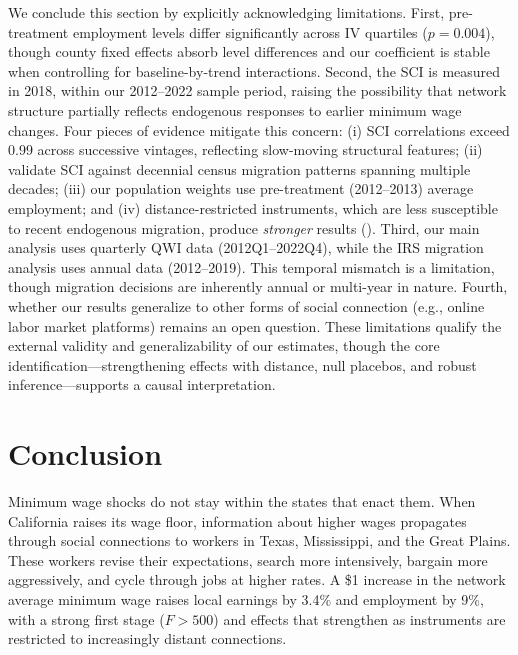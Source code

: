 \documentclass[12pt]{article}
\begin{document}
We conclude this section by explicitly acknowledging limitations. First, pre-treatment employment levels differ significantly across IV quartiles ($p = 0.004$), though county fixed effects absorb level differences and our coefficient is stable when controlling for baseline-by-trend interactions. Second, the SCI is measured in 2018, within our 2012--2022 sample period, raising the possibility that network structure partially reflects endogenous responses to earlier minimum wage changes. Four pieces of evidence mitigate this concern: (i) SCI correlations exceed 0.99 across successive vintages, reflecting slow-moving structural features; (ii) \citet{bailey2020social} validate SCI against decennial census migration patterns spanning multiple decades; (iii) our population weights use pre-treatment (2012--2013) average employment; and (iv) distance-restricted instruments, which are less susceptible to recent endogenous migration, produce \textit{stronger} results (). Third, our main analysis uses quarterly QWI data (2012Q1--2022Q4), while the IRS migration analysis uses annual data (2012--2019). This temporal mismatch is a limitation, though migration decisions are inherently annual or multi-year in nature. Fourth, whether our results generalize to other forms of social connection (e.g., online labor market platforms) remains an open question. These limitations qualify the external validity and generalizability of our estimates, though the core identification---strengthening effects with distance, null placebos, and robust inference---supports a causal interpretation.


\section{Conclusion}
\label{sec:conclusion}

Minimum wage shocks do not stay within the states that enact them. When California raises its wage floor, information about higher wages propagates through social connections to workers in Texas, Mississippi, and the Great Plains. These workers revise their expectations, search more intensively, bargain more aggressively, and cycle through jobs at higher rates. A \$1 increase in the network average minimum wage raises local earnings by 3.4\% and employment by 9\%, with a strong first stage ($F > 500$) and effects that strengthen as instruments are restricted to increasingly distant connections.
\end{document}
